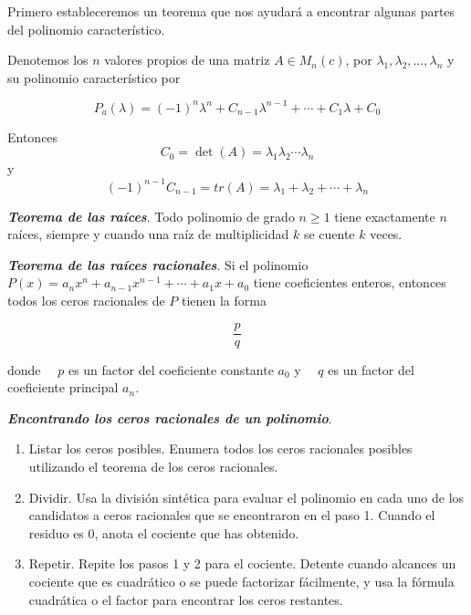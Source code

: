 \documentclass{report}
\begin{document}
    Primero estableceremos un teorema que nos ayudará a encontrar algunas partes del polinomio característico.
    
    \begin{thBox}
        Denotemos los $n$ valores propios de una matriz $A \in M_n(c)$, por $\lambda_1, \lambda_2, \dots , \lambda_n$ y su polinomio característico por
        
        $$P_a(\lambda) = (-1)^n\lambda^n + C_{n-1}\lambda^{n-1} + \cdots + C_1\lambda + C_0$$
        
        Entonces $$C_0 = \det(A) = \lambda_1 \lambda_2 \cdots \lambda_n$$ y $$(-1)^{n-1}C_{n-1} = tr(A) = \lambda_1 + \lambda_2 + \cdots + \lambda_n$$
    \end{thBox}
    
    \begin{thBox}
        \textit{\textbf{Teorema de las raíces}}. Todo polinomio de grado $n \geq 1$ tiene exactamente $n$ raíces, siempre y cuando una raíz de multiplicidad $k$ se cuente $k$ veces.
    \end{thBox}
    
    \begin{thBox}
        \textit{\textbf{Teorema de las raíces racionales}}. Si el polinomio $P(x)=a_n x^n+a_{n-1} x^{n-1}+\cdots+a_1 x+a_0$ tiene coeficientes enteros, entonces todos los ceros racionales de $P$ tienen la forma
        
        $$\frac{p}{q}$$
        
        donde $\quad p$ es un factor del coeficiente constante $a_0$
        y $\quad q$ es un factor del coeficiente principal $a_n$.
    \end{thBox}
    
    \begin{noteBox}
        \textit{\textbf{Encontrando los ceros racionales de un polinomio}}.
        \begin{enumerate}
            \item Listar los ceros posibles. Enumera todos los ceros racionales posibles utilizando el teorema de los ceros racionales.
            \item Dividir. Usa la división sintética para evaluar el polinomio en cada uno de los candidatos a ceros racionales que se encontraron en el paso 1. Cuando el residuo es $0$, anota el cociente que has obtenido.
            \item Repetir. Repite los pasos 1 y 2 para el cociente. Detente cuando alcances un cociente que es cuadrático o se puede factorizar fácilmente, y usa la fórmula cuadrática o el factor para encontrar los ceros restantes.
        \end{enumerate}
    \end{noteBox}
    
\end{document}
